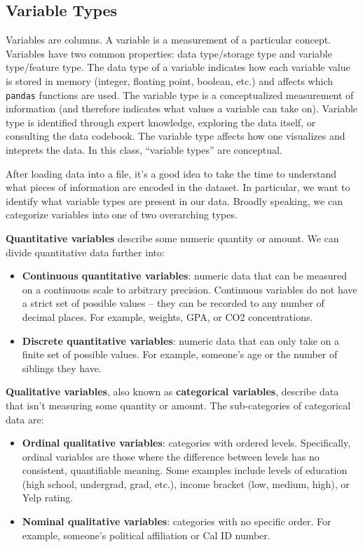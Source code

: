 \documentclass[
  letterpaper,
  DIV=11,
  numbers=noendperiod]{scrreprt}
\providecommand{\tightlist}{%
  \setlength{\itemsep}{0pt}\setlength{\parskip}{0pt}}\usepackage{longtable,booktabs,array}
\begin{document}
\hypertarget{variable-types}{%
\subsection{Variable Types}\label{variable-types}}

Variables are columns. A variable is a measurement of a particular
concept. Variables have two common properties: data type/storage type
and variable type/feature type. The data type of a variable indicates
how each variable value is stored in memory (integer, floating point,
boolean, etc.) and affects which \texttt{pandas} functions are used. The
variable type is a conceptualized measurement of information (and
therefore indicates what values a variable can take on). Variable type
is identified through expert knowledge, exploring the data itself, or
consulting the data codebook. The variable type affects how one
visualizes and inteprets the data. In this class, ``variable types'' are
conceptual.

After loading data into a file, it's a good idea to take the time to
understand what pieces of information are encoded in the dataset. In
particular, we want to identify what variable types are present in our
data. Broadly speaking, we can categorize variables into one of two
overarching types.

\textbf{Quantitative variables} describe some numeric quantity or
amount. We can divide quantitative data further into:

\begin{itemize}
\tightlist
\item
  \textbf{Continuous quantitative variables}: numeric data that can be
  measured on a continuous scale to arbitrary precision. Continuous
  variables do not have a strict set of possible values -- they can be
  recorded to any number of decimal places. For example, weights, GPA,
  or CO2 concentrations.
\item
  \textbf{Discrete quantitative variables}: numeric data that can only
  take on a finite set of possible values. For example, someone's age or
  the number of siblings they have.
\end{itemize}

\textbf{Qualitative variables}, also known as \textbf{categorical
variables}, describe data that isn't measuring some quantity or amount.
The sub-categories of categorical data are:

\begin{itemize}
\tightlist
\item
  \textbf{Ordinal qualitative variables}: categories with ordered
  levels. Specifically, ordinal variables are those where the difference
  between levels has no consistent, quantifiable meaning. Some examples
  include levels of education (high school, undergrad, grad, etc.),
  income bracket (low, medium, high), or Yelp rating.
\item
  \textbf{Nominal qualitative variables}: categories with no specific
  order. For example, someone's political affiliation or Cal ID number.
\end{itemize}
\end{document}
